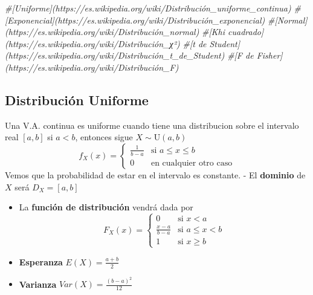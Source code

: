 \documentclass[
]{article}
\newenvironment{Shaded}{\begin{snugshade}}{\end{snugshade}}
\newcommand{\CommentTok}[1]{\textcolor[rgb]{0.56,0.35,0.01}{\textit{#1}}}
\begin{document}
\begin{Shaded}
\begin{Highlighting}[]
\CommentTok{\#[Uniforme](https://es.wikipedia.org/wiki/Distribución\_uniforme\_continua)}
\CommentTok{\#[Exponencial](https://es.wikipedia.org/wiki/Distribución\_exponencial)}
\CommentTok{\#[Normal](https://es.wikipedia.org/wiki/Distribución\_normal)}
\CommentTok{\#[Khi cuadrado](https://es.wikipedia.org/wiki/Distribución\_χ²)}
\CommentTok{\#[t de Student](https://es.wikipedia.org/wiki/Distribución\_t\_de\_Student)}
\CommentTok{\#[F de Fisher](https://es.wikipedia.org/wiki/Distribución\_F)}
\end{Highlighting}
\end{Shaded}

\hypertarget{distribuciuxf3n-uniforme}{%
\subsection{Distribución Uniforme}\label{distribuciuxf3n-uniforme}}

Una V.A. continua es uniforme cuando tiene una distribucion sobre el
intervalo real \([a,b]\) si \(a<b\), entonces sigue
\(X\sim\text{U}(a,b)\) \[f_X(x)=\left\{
\begin{array}{rl}
     \frac{1}{b-a} & \text{si } a\le x\le b
  \\ 0 & \text{en cualquier otro caso}
\end{array}
\right.\] Vemos que la probabilidad de estar en el intervalo es
constante. - El \textbf{dominio} de \(X\) será \(D_X = [a,b]\)

\begin{itemize}
\item
  La \textbf{función de distribución} vendrá dada por \[F_X(x)=\left\{
  \begin{array}{rl}
    0 & \text{si } x<a
  \\ \frac{x-a}{b-a} & \text{si } a\le x< b
  \\ 1 & \text{si } x\ge b
  \end{array}
  \right.\]
\item
  \textbf{Esperanza} \(E(X) = \frac{a+b}{2}\)
\item
  \textbf{Varianza} \(Var(X) = \frac{(b-a)^2}{12}\)
\end{itemize}
\end{document}
